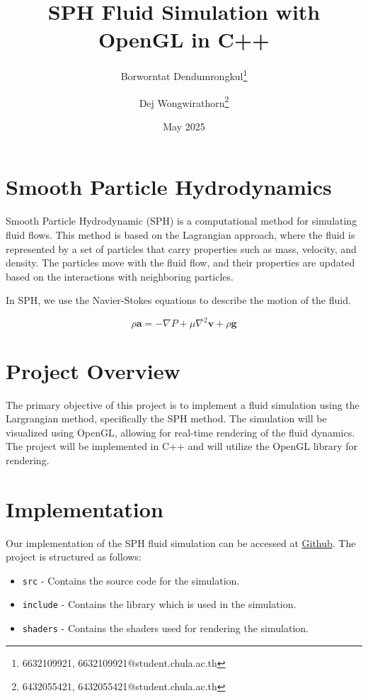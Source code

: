 \documentclass[a4paper]{article}
\title{SPH Fluid Simulation with OpenGL in C++}
\author{
  Borworntat Dendumrongkul\thanks{6632109921, 6632109921@student.chula.ac.th} \and 
  Dej Wongwirathorn\thanks{6432055421, 6432055421@student.chula.ac.th}
}
\date{May 2025}
\begin{document}
\maketitle

\section{Smooth Particle Hydrodynamics}

Smooth Particle Hydrodynamic (SPH) is a computational method for simulating fluid flows.
This method is based on the Lagrangian approach, where the fluid is represented by a set of particles that carry properties such as mass, velocity, and density.
The particles move with the fluid flow, and their properties are updated based on the interactions with neighboring particles.

In SPH, we use the Navier-Stokes equations to describe the motion of the fluid.

\[
  \rho \mathbf{a} = -\nabla P + \mu \nabla^2 \mathbf{v} + \rho \mathbf{g}
\]

\section{Project Overview}

The primary objective of this project is to implement a fluid simulation using the Largrangian method, specifically the SPH method.
The simulation will be visualized using OpenGL, allowing for real-time rendering of the fluid dynamics.
The project will be implemented in C++ and will utilize the OpenGL library for rendering.

\section{Implementation}

Our implementation of the SPH fluid simulation can be accessed at \href{https://github.com/MasterIceZ/SPH-FluidSimulation}{Github}.
The project is structured as follows:
\begin{itemize}
  \item \verb|src| - Contains the source code for the simulation.
  \item \verb|include| - Contains the library which is used in the simulation.
  \item \verb|shaders| - Contains the shaders used for rendering the simulation.
\end{itemize}
\end{document}
